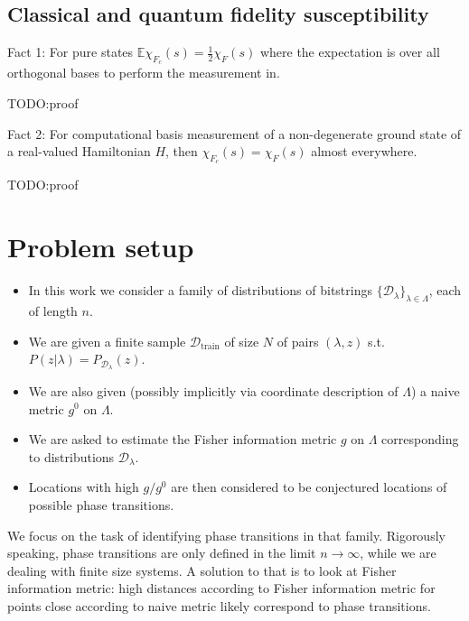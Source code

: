 \documentclass[american,aps,pra,reprint,floatfix,nofootinbib,superscriptaddress]{revtex4-2}
\begin{document}
\subsection{Classical and quantum fidelity susceptibility}
Fact 1: For pure states $\mathbb{E}\chi_{F_c} (s) = \frac12 \chi_F (s)$
where the expectation is over all orthogonal bases to perform the measurement in.

TODO:proof

Fact 2: For computational basis measurement of a non-degenerate ground state
of a real-valued Hamiltonian $H$, then $\chi_{F_c}(s) = \chi_F(s)$
almost everywhere.

TODO:proof

\section{Problem setup}
\begin{itemize}
  \item In this work we consider a family of distributions of
bitstrings $\{\mathcal{D}_{\lambda}\}_{\lambda \in \Lambda}$, each of length $n$.
  \item We are given a finite sample $\mathcal{D}_{\textrm{train}}$ of size $N$
  of pairs $(\lambda, z)$ s.t. $P(z|\lambda) = P_{\mathcal{D}_{\lambda}}(z)$.
  \item We are also given (possibly implicitly via coordinate description of $\Lambda$) a naive metric $g^0$ on $\Lambda$.
  \item We are asked to estimate the Fisher information metric $g$ on $\Lambda$ corresponding to distributions $\mathcal{D}_{\lambda}$.
  \item Locations with high $g / g^0$ are then considered to be conjectured locations of possible phase transitions.
\end{itemize}

We focus on the task of identifying phase transitions in that
family. Rigorously speaking, phase transitions are only defined
in the limit $n\to\infty$, while we are dealing with finite size systems.
A solution to that is to look at Fisher information metric: high distances according to Fisher information metric for points close according to naive metric likely correspond to phase transitions.
\end{document}
